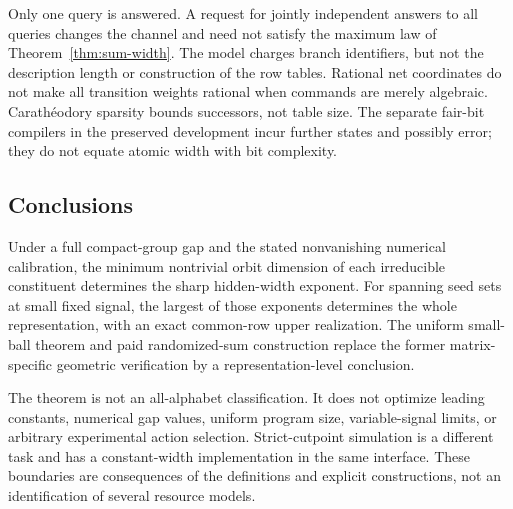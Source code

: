 Only one query is answered. A request for jointly independent answers
to all queries changes the channel and need not satisfy the
maximum law of Theorem~\ref{thm:sum-width}. The model charges branch
identifiers, but not the description length or construction of the
row tables. Rational net coordinates do not make all transition
weights rational when commands are merely algebraic. Carath\'eodory
sparsity bounds successors, not table size. The separate fair-bit
compilers in the preserved development incur further states and
possibly error; they do not equate atomic width with bit complexity.

\subsection{Conclusions}
Under a full compact-group gap and the stated nonvanishing numerical
calibration, the minimum nontrivial orbit dimension of each
irreducible constituent determines the sharp hidden-width exponent.
For spanning seed sets at small fixed signal, the largest of those
exponents determines the whole representation, with an exact
common-row upper realization. The uniform small-ball theorem and
paid randomized-sum construction replace the former matrix-specific
geometric verification by a representation-level conclusion.

The theorem is not an all-alphabet classification. It does not
optimize leading constants, numerical gap values, uniform program
size, variable-signal limits, or arbitrary experimental action
selection. Strict-cutpoint simulation is a different task and has
a constant-width implementation in the same interface. These
boundaries are consequences of the definitions and explicit
constructions, not an identification of several resource models.
